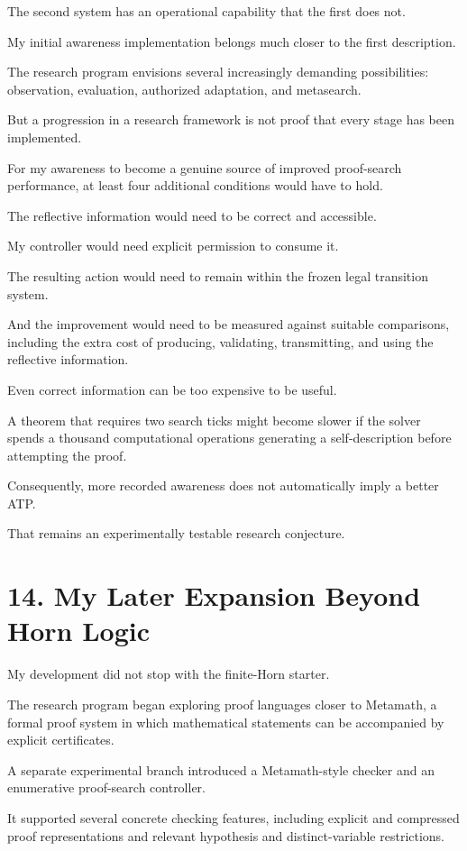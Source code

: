 \documentclass[11pt,letterpaper]{article}
\begin{document}
The second system has an operational capability that the first does not.

My initial awareness implementation belongs much closer to the first description.

The research program envisions several increasingly demanding possibilities: observation, evaluation, authorized adaptation, and metasearch.

But a progression in a research framework is not proof that every stage has been implemented.

For my awareness to become a genuine source of improved proof-search performance, at least four additional conditions would have to hold.

The reflective information would need to be correct and accessible.

My controller would need explicit permission to consume it.

The resulting action would need to remain within the frozen legal transition system.

And the improvement would need to be measured against suitable comparisons, including the extra cost of producing, validating, transmitting, and using the reflective information.

Even correct information can be too expensive to be useful.

A theorem that requires two search ticks might become slower if the solver spends a thousand computational operations generating a self-description before attempting the proof.

Consequently, more recorded awareness does not automatically imply a better ATP.

That remains an experimentally testable research conjecture.

\section{14. My Later Expansion Beyond Horn Logic}\label{my-later-expansion-beyond-horn-logic}

My development did not stop with the finite-Horn starter.

The research program began exploring proof languages closer to Metamath, a formal proof system in which mathematical statements can be accompanied by explicit certificates.

A separate experimental branch introduced a Metamath-style checker and an enumerative proof-search controller.

It supported several concrete checking features, including explicit and compressed proof representations and relevant hypothesis and distinct-variable restrictions.
\end{document}
